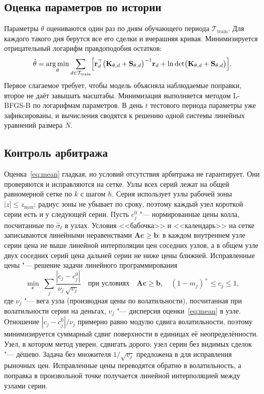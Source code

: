 \documentclass{article}
\DeclareMathOperator*{\argmin}{arg\,min}
\begin{document}
\subsection{Оценка параметров по истории}

Параметры $\theta$ оцениваются один раз по дням обучающего периода $\mathcal{T}_{\mathrm{train}}$. Для каждого такого дня берутся все его сделки и вчерашняя кривая. Минимизируется отрицательный логарифм правдоподобия остатков:
\begin{equation}\label{eq:nll}
\hat\theta=\argmin_{\theta}\sum_{d\in\mathcal{T}_{\mathrm{train}}}\Bigl[\mathbf{r}_d^{\top}\bigl(\mathbf{K}_{\theta,d}+\mathbf{S}_{\theta,d}\bigr)^{-1}\mathbf{r}_d+\ln\det\bigl(\mathbf{K}_{\theta,d}+\mathbf{S}_{\theta,d}\bigr)\Bigr].
\end{equation}
Первое слагаемое требует, чтобы модель объясняла наблюдаемые поправки, второе не даёт завышать масштабы. Минимизация выполняется методом L-BFGS-B по логарифмам параметров. В день $t$ тестового периода параметры уже зафиксированы, и вычисления сводятся к решению одной системы линейных уравнений размера $N$.

\subsection{Контроль арбитража}\label{sec:arb}

Оценка~\eqref{eq:mean} гладкая, но условий отсутствия арбитража не гарантирует. Они проверяются и исправляются на сетке. Узлы всех серий лежат на общей равномерной сетке по $k$ с шагом $h$. Серия использует узлы рабочей зоны $|z|\le z_{\max}$; радиус зоны не убывает по сроку, поэтому каждый узел короткой серии есть и у следующей серии. Пусть $c^0_j$ "--- нормированные цены колла, посчитанные по $\hat\sigma_t$ в узлах. Условия <<бабочка>> и <<календарь>> на сетке записываются линейными неравенствами $\mathbf{A}\mathbf{c}\ge\mathbf{b}$: в каждом внутреннем узле серии цена не выше линейной интерполяции цен соседних узлов, а в общем узле двух соседних серий цена дальней серии не ниже цены ближней. Исправленные цены "--- решение задачи линейного программирования
\begin{equation}\label{eq:lp}
\min_{\mathbf{c}}\;\sum_j \frac{|c_j-c^0_j|}{\nu_j\,\sqrt{v_j}}\quad\text{при условиях}\quad \mathbf{A}\mathbf{c}\ge\mathbf{b},\quad (1-m_j)^+\le c_j\le 1,
\end{equation}
где $\nu_j$ "--- вега узла (производная цены по волатильности), посчитанная при волатильности серии на деньгах, $v_j$ "--- дисперсия оценки~\eqref{eq:mean} в узле. Отношение $|c_j-c_j^0|/\nu_j$ примерно равно модулю сдвига волатильности, поэтому минимизируется суммарный сдвиг поверхности в единицах её неопределённости. Узел, в котором метод уверен, сдвигать дорого; узел серии без видимых сделок "--- дёшево. Задача без множителя $1/\sqrt{v_j}$ предложена в \citep{cohen2020detecting} для исправления рыночных цен. Исправленные цены переводятся обратно в волатильность, а поправка в произвольной точке получается линейной интерполяцией между узлами серии.
\end{document}
